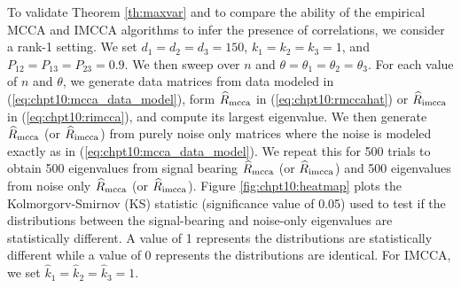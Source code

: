To validate Theorem \ref{th:maxvar} and to compare the ability of the empirical MCCA
and IMCCA algorithms to infer the presence of correlations, we consider a rank-1 setting. We set $d_1 =d_2=d_3=150$, $k_1=k_2=k_3=1$, and
$P_{12}=P_{13}=P_{23}=0.9$. We then sweep over $n$ and
$\theta=\theta_1=\theta_2=\theta_3$. For each value of $n$ and $\theta$, we generate data
matrices from data modeled in (\ref{eq:chpt10:mcca_data_model}), form $\widehat{R}_{\text{mcca}}$ in
(\ref{eq:chpt10:rmccahat}) or $\widehat{R}_{\text{imcca}}$ in (\ref{eq:chpt10:rimcca}), and compute its
largest eigenvalue. We then generate $\widehat{R}_{\text{mcca}}$ (or $\widehat{R}_{\text{imcca}}$) from purely noise only
matrices where the noise is modeled exactly as in (\ref{eq:chpt10:mcca_data_model}). We
repeat this for 500 trials to obtain 500 eigenvalues from signal bearing $\widehat{R}_{\text{mcca}}$ (or
$\widehat{R}_{\text{imcca}}$) and 500 eigenvalues from noise only $\widehat{R}_{\text{mcca}}$ (or $\widehat{R}_{\text{imcca}}$). Figure
\ref{fig:chpt10:heatmap} plots the Kolmorgorv-Smirnov (KS) statistic (significance value
of 0.05) used to test if the distributions between the signal-bearing and noise-only
eigenvalues are statistically different. A value of 1 represents the distributions are
statistically different while a value of 0 represents the distributions are identical. For
IMCCA, we set $\widehat{k}_1=\widehat{k}_2=\widehat{k}_3=1$.

